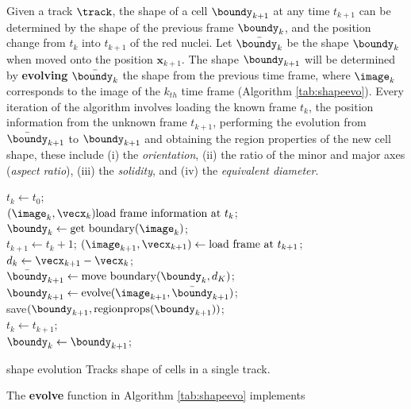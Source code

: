 Given a track $\track$, the shape of a cell $\boundy_{k+1}$
at any time $t_{k+1}$ can be determined by the shape
of the previous frame $\boundy_{k}$, and the position change
from $t_k$ into $t_{k+1}$ of the red nuclei. Let $\bar{\boundy_{k}}$ be the
shape $\boundy_{k}$ when moved onto the position $\mathbf{x}_{k+1}$.
The shape $\boundy_{k+1}$ will be determined by \textbf{evolving}
$\bar{\boundy_{k}}$ the shape from the previous time frame,
where $\image_k$ corresponds to the image of the $k_{th}$ time frame
(Algorithm \ref{tab:shapeevo}). Every iteration of the
algorithm involves loading the known frame $t_k$, the position information
from the unknown frame $t_{k+1}$, performing the evolution from
$\bar{\boundy}_{k+1}$ to $\boundy_{k+1}$ and obtaining the region properties
of the new cell shape, these include
(i) the \emph{orientation},
(ii) the ratio of the minor and major axes (\emph{aspect ratio}),
(iii) the \emph{solidity}, and
(iv) the \emph{equivalent diameter}.
\begin{algorithm}
$t_k \gets t_0$;\\
$(\image_k, \vecx_k) \text{load frame information at } t_k$;\\
$\boundy_k \gets \text{get boundary}(\image_k)$;\\
 {
    $t_{k+1} \gets t_k+1$;
    $(\image_{k+1},\vecx_{k+1}) \gets \text{load frame at } t_{k+1}$;
    $d_k \gets \vecx_{k+1}-\vecx_k$;\\
    $\bar{\boundy}_{k+1} \gets \text{move boundary}
    (\boundy_k, d_K)$;\\
    $\boundy_{k+1} \gets \text{evolve}(\image_{k+1}, \bar{\boundy}_{k+1})$;\\
    save$(\boundy_{k+1}, \text{regionprops}(\boundy_{k+1}))$;\\
    $t_k \gets t_{k+1}$;\\
    $\boundy_k \gets \boundy_{k+1}$;\\
}
\caption{\small {\sc shape evolution} Tracks shape of cells in a single track.}
\label{tab:shapeevo}
\end{algorithm}
The \textbf{evolve} function in Algorithm \ref{tab:shapeevo} implements
